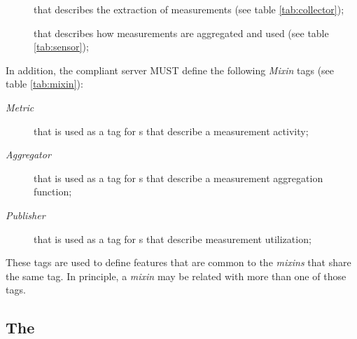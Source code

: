 \documentclass[12pt]{article}  %
\begin{document}
\begin{description}

\item [\coll] that describes the extraction of measurements (see table \ref{tab:collector});

\item [\sens] that describes how measurements are aggregated and used (see table  \ref{tab:sensor});

\end{description}
 

In addition, the compliant server MUST define the following {\em Mixin} tags (see table \ref{tab:mixin}): 

\begin{description}

\item [{\em Metric}] that is used as a tag for \mi s that describe a measurement activity;

\item [{\em Aggregator}] that is used as a tag for \mi s that describe a measurement aggregation function;

\item [{\em Publisher}] that is used as a tag for \mi s that describe measurement utilization;

\end{description}

These tags are used to define features that are common to the {\em mixins} that share the same tag. In principle, a {\em mixin} may be related with more than one of those tags. 

\subsection{The \coll}
\end{document}
